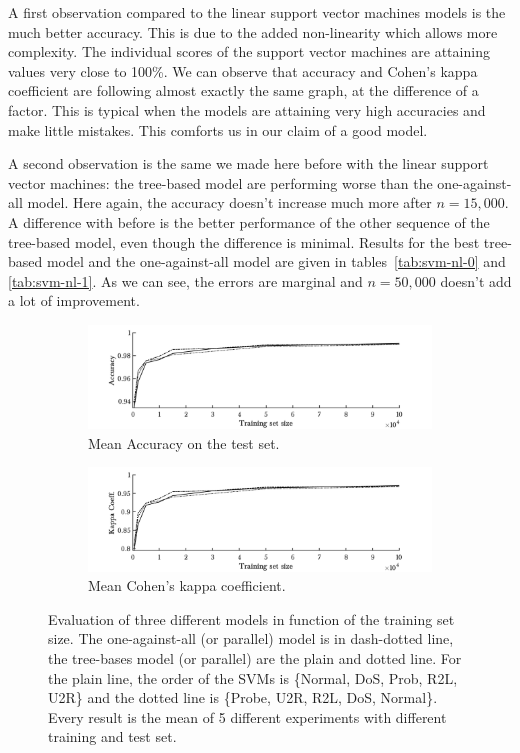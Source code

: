 A first observation compared to the linear support vector machines models is the much better accuracy. This is due to the added non-linearity which allows more complexity. The individual scores of the support vector machines are attaining values very close to 100\%. We can observe that accuracy and Cohen's kappa coefficient are following almost exactly the same graph, at the difference of a factor. This is typical when the models are attaining very high accuracies and make little mistakes. This comforts us in our claim of a good model.

A second observation is the same we made here before with the linear support vector machines: the tree-based model are performing worse than the one-against-all model. Here again, the accuracy doesn't increase much more after $n=15,000$. A difference with before is the better performance of the other sequence of the tree-based model, even though the difference is minimal. Results for the best tree-based model and the one-against-all model are given in tables~\ref{tab:svm-nl-0} and \ref{tab:svm-nl-1}. As we can see, the errors are marginal and $n=50,000$ doesn't add a lot of improvement.

\begin{figure}
        \begin{subfigure}[b]{1\textwidth}  
            \centering 
            \includegraphics[width=.98\textwidth]{parts/chap-4/img-svm/svm-nl-acc.png}
            \caption{Mean Accuracy on the test set.} 
        \end{subfigure}
        \vfill
        \begin{subfigure}[b]{1\textwidth}   
            \centering 
            \includegraphics[width=.98\textwidth]{parts/chap-4/img-svm/svm-nl-kappa.png}
            \caption{Mean Cohen's kappa coefficient.} 
        \end{subfigure}
        \caption{Evaluation of three different models in function of the training set size. The one-against-all (or parallel) model is in dash-dotted line, the tree-bases model (or parallel) are the plain and dotted line. For the plain line, the order of the SVMs is \{Normal, DoS, Prob, R2L, U2R\} and the dotted line is \{Probe, U2R, R2L, DoS, Normal\}. Every result is the mean of 5 different experiments with different training and test set.}
        \label{fig:svm-nl}
\end{figure}

